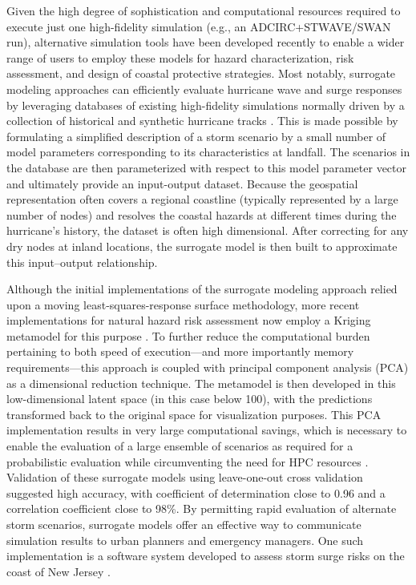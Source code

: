 Given the high degree of sophistication and computational resources required to execute just one high-fidelity simulation (e.g., an ADCIRC+STWAVE/SWAN run), alternative simulation tools have been developed recently to enable a wider range of users to employ these models for hazard characterization, risk assessment, and design of coastal protective strategies. Most notably, surrogate modeling approaches can efficiently evaluate hurricane wave and surge responses by leveraging databases of existing high-fidelity simulations normally driven by a collection of historical and synthetic hurricane tracks \citep{usace2015north}. This is made possible by formulating a simplified description of a storm scenario by a small number of model parameters corresponding to its characteristics at landfall. The scenarios in the database are then parameterized with respect to this model parameter vector and ultimately provide an input-output dataset. Because the geospatial representation often covers a regional coastline (typically represented by a large number of nodes) and resolves the coastal hazards at different times during the hurricane's history, the dataset is often high dimensional. After correcting for any dry nodes at inland locations, the surrogate model is then built to approximate this input--output relationship. 

Although the initial implementations of the surrogate modeling approach relied upon a moving least-squares-response surface methodology, more recent implementations for natural hazard risk assessment now employ a Kriging metamodel for this purpose \citep{jia2013kriging}. To further reduce the computational burden pertaining to both speed of execution---and more importantly memory requirements---this approach is coupled with principal component analysis (PCA) as a dimensional reduction technique. The metamodel is then developed in this low-dimensional latent space (in this case below 100), with the predictions transformed back to the original space for visualization purposes. This PCA implementation results in very large computational savings, which is necessary to enable the evaluation of a large ensemble of scenarios as required for a probabilistic evaluation while circumventing the need for HPC resources \citep{jia2013kriging}. Validation of these surrogate models using leave-one-out cross validation \citep{taflanidis2017advances} suggested high accuracy, with coefficient of determination close to 0.96 and a correlation coefficient close to 98\%. By permitting rapid evaluation of alternate storm scenarios, surrogate models offer an effective way to communicate simulation results to urban planners and emergency managers. One such implementation is a software system developed to assess storm surge risks on the coast of New Jersey \citep{njcoast2018implementation}.

